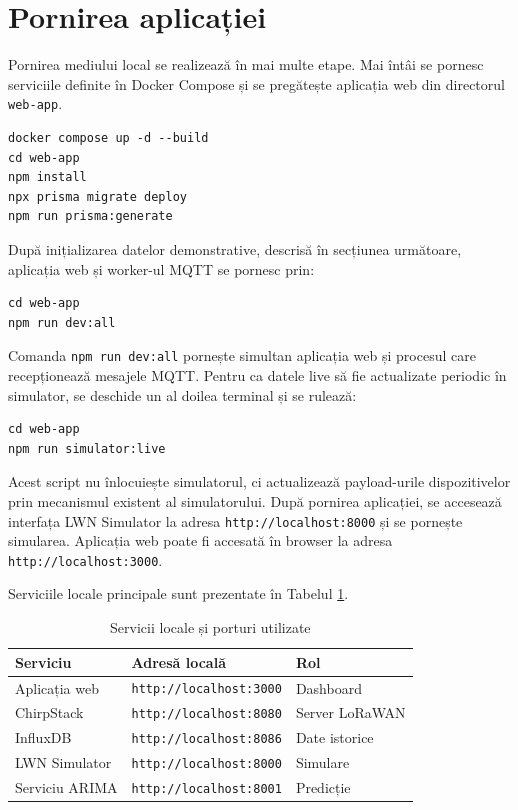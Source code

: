 \section{Pornirea aplicației}

Pornirea mediului local se realizează în mai multe etape. Mai întâi se pornesc serviciile definite în Docker Compose și se pregătește aplicația web din directorul \texttt{web-app}.

\begin{verbatim}
docker compose up -d --build
cd web-app
npm install
npx prisma migrate deploy
npm run prisma:generate
\end{verbatim}

După inițializarea datelor demonstrative, descrisă în secțiunea următoare, aplicația web și worker-ul MQTT se pornesc prin:

\begin{verbatim}
cd web-app
npm run dev:all
\end{verbatim}

Comanda \texttt{npm run dev:all} pornește simultan aplicația web și procesul care recepționează mesajele MQTT. Pentru ca datele live să fie actualizate periodic în simulator, se deschide un al doilea terminal și se rulează:

\begin{verbatim}
cd web-app
npm run simulator:live
\end{verbatim}

Acest script nu înlocuiește simulatorul, ci actualizează payload-urile dispozitivelor prin mecanismul existent al simulatorului. După pornirea aplicației, se accesează interfața LWN Simulator la adresa \texttt{http://localhost:8000} și se pornește simularea. Aplicația web poate fi accesată în browser la adresa \texttt{http://localhost:3000}.

Serviciile locale principale sunt prezentate în Tabelul \ref{tab:servicii-porturi}.

\begin{table}[htbp]
\centering
\small
\begin{tabular}{|p{}|p{}|p{}|}
\hline
\textbf{Serviciu} & \textbf{Adresă locală} & \textbf{Rol} \\
\hline
Aplicația web & \texttt{http://localhost:3000} & Dashboard \\
\hline
ChirpStack & \texttt{http://localhost:8080} & Server LoRaWAN \\
\hline
InfluxDB & \texttt{http://localhost:8086} & Date istorice \\
\hline
LWN Simulator & \texttt{http://localhost:8000} & Simulare \\
\hline
Serviciu ARIMA & \texttt{http://localhost:8001} & Predicție \\
\hline
\end{tabular}
\caption{Servicii locale și porturi utilizate}
\label{tab:servicii-porturi}
\end{table}

